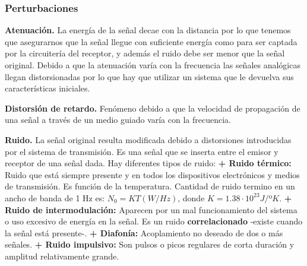 \documentclass[10pt,a4paper]{article}
\begin{document}
\subsubsection{Perturbaciones}
\begin{description}
\item \textbf{Atenuación.} La energía de la señal decae con la distancia por lo que tenemos que asegurarnos que la señal llegue con suficiente energía como para ser captada por la circuitería del receptor, y además el ruido debe ser menor que la señal original. Debido a que la atenuación varía con la frecuencia las señales analógicas llegan distorsionadas por lo que hay que utilizar un sistema que le devuelva sus características iniciales.
\item \textbf{Distorsión de retardo.} Fenómeno debido a que la velocidad de propagación de una señal a través de un medio guiado varía con la frecuencia.
\item \textbf{Ruido.} La señal original resulta modificada debido a distorsiones introducidas por el sistema de transmisión. Es una señal que se inserta entre el emisor y receptor de una señal dada. Hay diferentes tipos de ruido:
\subitem \textbf{+ Ruido térmico:} Ruido que está siempre presente y en todos los dispositivos electrónicos y medios de transmisión. Es función de la temperatura. Cantidad de ruido termino en un ancho de banda de 1 Hz es: 
$N_0 = KT (W/Hz)$, donde $K = 1.38 \cdot 10^{23} J/$º$K$.
\subitem \textbf{+ Ruido de intermodulación:} Aparecen por un mal funcionamiento del sistema o uso excesivo de energía en la señal.
Es un ruido \textbf{correlacionado} -existe cuando la señal está presente-.
\subitem \textbf{+ Diafonía:} Acoplamiento no deseado de dos o más señales.
\subitem \textbf{+ Ruido impulsivo:} Son pulsos o picos regulares de corta duración y amplitud relativamente grande.
\end{description}
\end{document}

